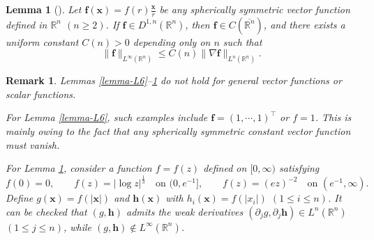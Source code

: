 \documentclass[11pt,reqno]{amsart}
\newtheorem{lem}{Lemma}[section]
\newtheorem{rk}{Remark}
\numberwithin{rk}{section}
\numberwithin{prop}{section}
\numberwithin{mydef}{section}
\numberwithin{lem}{section}
\numberwithin{equation}{section}
\numberwithin{thm}{section}
\begin{document}
\begin{lem}[\cite{CZZ1}]\label{Hk-Ck-vector}
Let $\boldsymbol{f}(\boldsymbol{x})=f(r)\frac{\boldsymbol{x}}{r}$ be any spherically symmetric vector function defined in $\mathbb{R}^n$ $(n\geq 2)$. If $\boldsymbol{f}\in D^{1,n}(\mathbb{R}^n)$, then $\boldsymbol{f}\in C(\overline{\mathbb{R}^n})$, and there exists a uniform constant $C(n)>0$ depending only on $n$ such that
\begin{equation}\label{vectorC3}
\|\boldsymbol{f}\|_{L^\infty(\mathbb{R}^n)}\leq C(n)\|\nabla\boldsymbol{f}\|_{L^n(\mathbb{R}^n)}.
\end{equation}
\end{lem}








\begin{rk}\label{remc1}
{\rm Lemmas \ref{lemma-L6}--\ref{Hk-Ck-vector}} do not hold for general vector functions or scalar functions.

For {\rm Lemma \ref{lemma-L6}}, such examples include  
$\boldsymbol{f}=(1,\cdots\!,1)^\top$ or $f=1$. This is mainly owing to the fact that any spherically symmetric constant vector function must vanish. 

For {\rm Lemma \ref{Hk-Ck-vector}}, consider a function $f=f(z)$ defined on $[0,\infty)$ satisfying
\begin{equation*} 
f(0)=0,\qquad f(z)= |\log z|^\frac{1}{3}\quad \text{on $(0,e^{-1}]$},\qquad f(z)=(ez)^{-2}\quad  \text{on $(e^{-1},\infty)$}.
\end{equation*}
Define $g(\boldsymbol{x})\!=\!f(|\boldsymbol{x}|)$ and $\boldsymbol{h}(\boldsymbol{x})$ with $h_i(\boldsymbol{x})=f(|x_i|)$ $(1\leq i\leq n)$. 
It can be checked that $(g,\boldsymbol{h})$ admits the weak derivatives $(\partial_jg,\partial_j\boldsymbol{h})\in L^n(\mathbb{R}^n)$ $(1\leq j\leq n)$, while $(g,\boldsymbol{h})\notin L^\infty(\mathbb{R}^n)$.
\end{rk}
\end{document}
